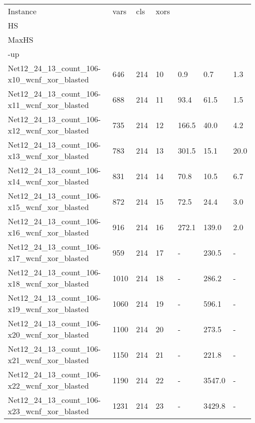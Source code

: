 \begin{scriptsize}
  \begin{longtable}{|p{5cm}|l|l|l|l|l|l|}
\hline
Instance & vars & cls & xors & \begin{tabular}[c]{@{}l@{}}Max\\ HS\end{tabular}
  & \begin{tabular}[c]{@{}l@{}}Gauss\\ MaxHS\end{tabular} & 
\begin{tabular}[c]{@{}l@{}}speed\\-up\end{tabular} \\ \hline
\endhead
%
Net12\_24\_13\_count\_106-x10\_wcnf\_xor\_blasted&646&214&10&0.9&0.7&1.3 \\ \hline 
Net12\_24\_13\_count\_106-x11\_wcnf\_xor\_blasted&688&214&11&93.4&61.5&1.5 \\ \hline 
Net12\_24\_13\_count\_106-x12\_wcnf\_xor\_blasted&735&214&12&166.5&40.0&4.2 \\ \hline 
Net12\_24\_13\_count\_106-x13\_wcnf\_xor\_blasted&783&214&13&301.5&15.1&20.0 \\ \hline 
Net12\_24\_13\_count\_106-x14\_wcnf\_xor\_blasted&831&214&14&70.8&10.5&6.7 \\ \hline 
Net12\_24\_13\_count\_106-x15\_wcnf\_xor\_blasted&872&214&15&72.5&24.4&3.0 \\ \hline 
Net12\_24\_13\_count\_106-x16\_wcnf\_xor\_blasted&916&214&16&272.1&139.0&2.0 \\ \hline 
Net12\_24\_13\_count\_106-x17\_wcnf\_xor\_blasted&959&214&17&-&230.5&- \\ \hline 
Net12\_24\_13\_count\_106-x18\_wcnf\_xor\_blasted&1010&214&18&-&286.2&- \\ \hline 
Net12\_24\_13\_count\_106-x19\_wcnf\_xor\_blasted&1060&214&19&-&596.1&- \\ \hline 
Net12\_24\_13\_count\_106-x20\_wcnf\_xor\_blasted&1100&214&20&-&273.5&- \\ \hline 
Net12\_24\_13\_count\_106-x21\_wcnf\_xor\_blasted&1150&214&21&-&221.8&- \\ \hline 
Net12\_24\_13\_count\_106-x22\_wcnf\_xor\_blasted&1190&214&22&-&3547.0&- \\ \hline 
Net12\_24\_13\_count\_106-x23\_wcnf\_xor\_blasted&1231&214&23&-&3429.8&- \\ \hline 

\end{longtable}
\end{scriptsize}
